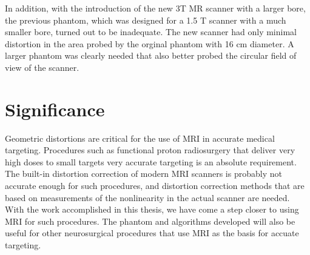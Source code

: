 In addition, with the introduction of the new 3T MR scanner with a larger bore, the previous phantom, which was designed for a 1.5 T scanner with a much smaller bore, turned out to be inadequate. The new scanner had only minimal distortion in the area probed by the orginal phantom with 16 cm diameter. A larger phantom was clearly needed that also better probed the circular field of view of the scanner.

\section{Significance}

Geometric distortions are critical for the use of MRI in accurate medical targeting. Procedures such as functional proton radiosurgery that deliver very high doses to small targets very accurate targeting is an absolute requirement. The built-in distortion correction of modern MRI scanners is probably not accurate enough for such procedures, and distortion correction methods that are based on measurements of the nonlinearity in the actual scanner are needed. With the work accomplished in this thesis, we have come a step closer to using MRI for such procedures. The phantom and algorithms developed will also be useful for other neurosurgical procedures that use MRI as the basis for accuate targeting.





